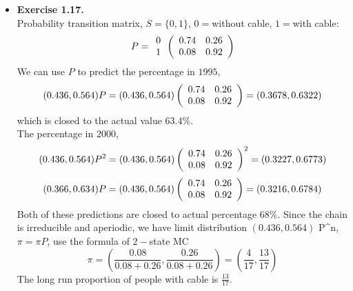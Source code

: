 \documentclass[12pt]{article}
\theoremstyle{remark}
\theoremstyle{definition}
\numberwithin{figure}{section}
\begin{document}
\begin{itemize}
  \item 
\textbf{Exercise 1.17.}\\
Probability transition matrix, $S=\big\{0,1\big\}$, $0=$without cable, $1=$with cable:
\begin{align*}
P =\begin{array}{c} 0\\ 1 \end{array} \left( \begin{array}{ c c}
 0.74 & 0.26\\
 0.08 & 0.92 
\end{array}\right)
\end{align*}
We can use $P$ to predict the percentage in $1995$,
\begin{align*}
(0.436,0.564) P = (0.436,0.564)\left( \begin{array}{ c c}
 0.74 & 0.26\\
 0.08 & 0.92 
\end{array}\right)=(0.3678,0.6322)
\end{align*}
which is closed to the actual value $63.4\%$.\\
The percentage in $2000$,
\begin{align*}
(0.436,0.564) P^2 = (0.436,0.564)\left( \begin{array}{ c c}
 0.74 & 0.26\\
 0.08 & 0.92 
\end{array}\right)^2=(0.3227,0.6773)
\end{align*}
\begin{align*}
(0.366,0.634) P = (0.436,0.564)\left( \begin{array}{ c c}
 0.74 & 0.26\\
 0.08 & 0.92 
\end{array}\right)=(0.3216,0.6784)
\end{align*}
Both of these predictions are closed to actual percentage $68\%$. Since the chain is irreducible and aperiodic, we have limit distribution $(0.436,0.564)$ P^n, $\pi=\pi P$, use the formula of $2-$state MC
\begin{equation*}
    \pi = (\frac{0.08}{0.08+0.26},\frac{0.26}{0.08+0.26})=(\frac{4}{17},\frac{13}{17})
\end{equation*}
The long run proportion of people with cable is $\frac{13}{17}$.
\end{itemize}

\vspace{.1in}
\end{document}
